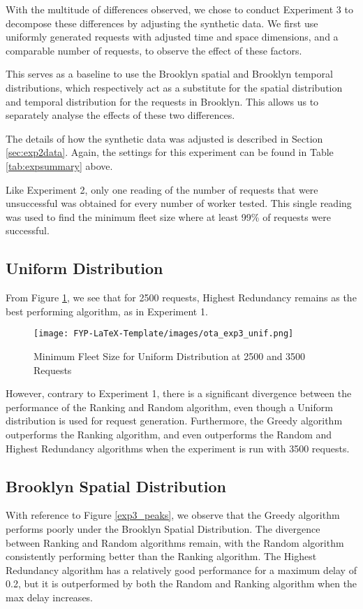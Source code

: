 \documentclass[urop]{socreport}
\begin{document}
With the multitude of differences observed, we chose to conduct Experiment 3 to decompose these differences by adjusting the synthetic data. We first use uniformly generated requests with adjusted time and space dimensions, and a comparable number of requests, to observe the effect of these factors. 

This serves as a baseline to use the Brooklyn spatial and Brooklyn temporal distributions, which respectively act as a substitute for the spatial distribution and temporal distribution for the requests in Brooklyn. This allows us to separately analyse the effects of these two differences.

The details of how the synthetic data was adjusted is described in Section \ref{sec:exp2data}. Again, the settings for this experiment can be found in Table \ref{tab:expsummary} above. 

Like Experiment 2, only one reading of the number of requests that were unsuccessful was obtained for every number of worker tested. This single reading was used to find the minimum fleet size where at least 99\% of requests were successful. 

\subsection{Uniform Distribution}
From Figure \ref{fig:exp3_unif}, we see that for 2500 requests, Highest Redundancy remains as the best performing algorithm, as in Experiment 1.

\begin{figure}[h]
    \centering
    \texttt{[image: FYP-LaTeX-Template/images/ota\_exp3\_unif.png]}
    \caption{Minimum Fleet Size for Uniform Distribution at 2500 and 3500 Requests}
    \label{fig:exp3_unif}
\end{figure}

However, contrary to Experiment 1, there is a significant divergence between the performance of the Ranking and Random algorithm, even though a Uniform distribution is used for request generation. Furthermore, the Greedy algorithm outperforms the Ranking algorithm, and even outperforms the Random and Highest Redundancy algorithms when the experiment is run with 3500 requests.


\subsection{Brooklyn Spatial Distribution}
With reference to Figure \ref{exp3_peaks}, we observe that the Greedy algorithm performs poorly under the Brooklyn Spatial Distribution. The divergence between Ranking and Random algorithms remain, with the Random algorithm consistently performing better than the Ranking algorithm. The Highest Redundancy algorithm has a relatively good performance for a maximum delay of 0.2, but it is outperformed by both the Random and Ranking algorithm when the max delay increases.
\end{document}
